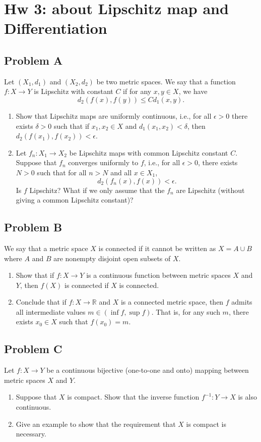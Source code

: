 \documentclass[lang=cn,11pt]{template}
\begin{document}
\chapter*{Hw 3: about Lipschitz map and Differentiation}

\section*{Problem A}
Let \( (X_1, d_1) \) and \( (X_2, d_2) \) be two metric spaces. We say that a function \( f : X \to Y \) is Lipschitz with constant \( C \) if for any \( x, y \in X \), we have
\[
d_2(f(x), f(y)) \leq C d_1(x, y).
\]
\begin{enumerate}
    \item Show that Lipschitz maps are uniformly continuous, i.e., for all \( \epsilon > 0 \) there exists \( \delta > 0 \) such that if \( x_1, x_2 \in X \) and \( d_1(x_1, x_2) < \delta \), then \( d_2(f(x_1), f(x_2)) < \epsilon \).
    \item Let \( f_n : X_1 \to X_2 \) be Lipschitz maps with common Lipschitz constant \( C \). Suppose that \( f_n \) converges uniformly to \( f \), i.e., for all \( \epsilon > 0 \), there exists \( N > 0 \) such that for all \( n > N \) and all \( x \in X_1 \),
    \[
    d_2(f_n(x), f(x)) < \epsilon.
    \]
    Is \( f \) Lipschitz? What if we only assume that the \( f_n \) are Lipschitz (without giving a common Lipschitz constant)?
\end{enumerate}

\section*{Problem B}
We say that a metric space \( X \) is connected if it cannot be written as \( X = A \cup B \) where \( A \) and \( B \) are nonempty disjoint open subsets of \( X \).
\begin{enumerate}
    \item Show that if \( f : X \to Y \) is a continuous function between metric spaces \( X \) and \( Y \), then \( f(X) \) is connected if \( X \) is connected.
    \item Conclude that if \( f : X \to \mathbb{R} \) and \( X \) is a connected metric space, then \( f \) admits all intermediate values \( m \in (\inf f, \sup f) \). That is, for any such \( m \), there exists \( x_0 \in X \) such that \( f(x_0) = m \).
\end{enumerate}

\section*{Problem C}
Let \( f : X \to Y \) be a continuous bijective (one-to-one and onto) mapping between metric spaces \( X \) and \( Y \).
\begin{enumerate}
    \item Suppose that \( X \) is compact. Show that the inverse function \( f^{-1} : Y \to X \) is also continuous.
    \item Give an example to show that the requirement that \( X \) is compact is necessary.
\end{enumerate}
\end{document}
